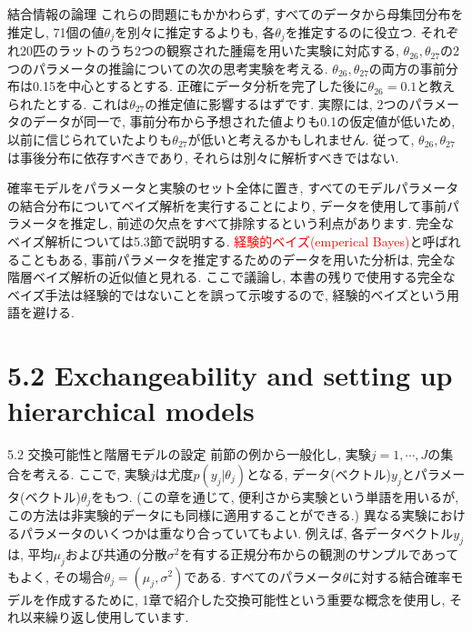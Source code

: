 \documentclass[10pt,dvipdfmx,a4]{beamer}
\newcommand{\tcr}[1]{\textcolor{red}{#1}}
\begin{document}
\begin{frame}{結合情報の論理}
これらの問題にもかかわらず, すべてのデータから母集団分布を推定し, 71個の値$\theta_j$を別々に推定するよりも, 各$\theta_j$を推定するのに役立つ.
それぞれ20匹のラットのうち2つの観察された腫瘍を用いた実験に対応する, $\theta_{26}, \theta_{27}$の2つのパラメータの推論についての次の思考実験を考える.
$\theta_{26}, \theta_{27}$の両方の事前分布は0.15を中心とするとする.
正確にデータ分析を完了した後に$\theta_{26}= 0.1$と教えられたとする.
これは$\theta_{27}$の推定値に影響するはずです.
実際には, 2つのパラメータのデータが同一で, 事前分布から予想された値よりも0.1の仮定値が低いため, 以前に信じられていたよりも$\theta_{27}$が低いと考えるかもしれません.
従って, $\theta_{26}, \theta_{27}$は事後分布に依存すべきであり, それらは別々に解析すべきではない.

確率モデルをパラメータと実験のセット全体に置き, すべてのモデルパラメータの結合分布についてベイズ解析を実行することにより, データを使用して事前パラメータを推定し, 前述の欠点をすべて排除するという利点があります.
完全なベイズ解析については5.3節で説明する.
\tcr{経験的ベイズ(emperical Bayes)}と呼ばれることもある, 事前パラメータを推定するためのデータを用いた分析は, 完全な階層ベイズ解析の近似値と見れる.
ここで議論し, 本書の残りで使用する完全なベイズ手法は経験的ではないことを誤って示唆するので, 経験的ベイズという用語を避ける.
\end{frame}

\section{5.2 Exchangeability and setting up hierarchical models}
\begin{frame}{5.2 交換可能性と階層モデルの設定}
前節の例から一般化し, 実験$j=1,\cdots,J$の集合を考える.
ここで, 実験$j$は尤度$p(y_j|\theta_j)$となる, データ(ベクトル)$y_j$とパラメータ(ベクトル)$\theta_j$をもつ.
(この章を通じて, 便利さから実験という単語を用いるが, この方法は非実験的データにも同様に適用することができる.)
異なる実験におけるパラメータのいくつかは重なり合っていてもよい.
例えば, 各データベクトル$y_j$は, 平均$\mu_j$および共通の分散$\sigma^2$を有する正規分布からの観測のサンプルであってもよく, その場合$\theta_j=(\mu_j, \sigma^2)$である.
すべてのパラメータ$\theta$に対する結合確率モデルを作成するために, 1章で紹介した交換可能性という重要な概念を使用し, それ以来繰り返し使用しています.
\end{frame}

\end{document}
